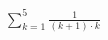 \documentclass[border=6pt]{standalone}
\begin{document}
$\displaystyle\sum_{k=1}^5 \frac{1}{(k+1) \cdot k}$
\end{document}
